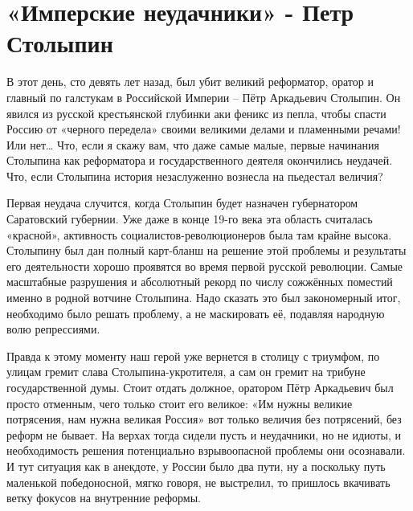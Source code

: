 \chapter{«Имперские неудачники» - Петр Столыпин}

В этот день, сто девять лет назад, был убит великий реформатор, оратор и главный по галстукам в Российской Империи – Пётр Аркадьевич Столыпин. Он явился из русской крестьянской глубинки аки феникс из пепла, чтобы спасти Россию от «черного передела» своими великими делами и пламенными речами! Или нет… Что, если я скажу вам, что даже самые малые, первые начинания Столыпина как реформатора и государственного деятеля окончились неудачей. Что, если Столыпина история незаслуженно вознесла на пьедестал величия?

Первая неудача случится, когда Столыпин будет назначен губернатором Саратовский губернии. Уже даже в конце 19-го века эта область считалась «красной», активность социалистов-революционеров была там крайне высока. Столыпину был дан полный карт-бланш на решение этой проблемы и результаты его деятельности хорошо проявятся во время первой русской революции. Самые масштабные разрушения и абсолютный рекорд по числу сожжённых поместий именно в родной вотчине Столыпина. Надо сказать это был закономерный итог, необходимо было решать проблему, а не маскировать её, подавляя народную волю репрессиями.

Правда к этому моменту наш герой уже вернется в столицу с триумфом, по улицам гремит слава Столыпина-укротителя, а сам он гремит на трибуне государственной думы. Стоит отдать должное, оратором Пётр Аркадьевич был просто отменным, чего только стоит его великое: «Им нужны великие потрясения, нам нужна великая Россия» вот только величия без потрясений, без реформ не бывает. На верхах тогда сидели пусть и неудачники, но не идиоты, и необходимость решения потенциально взрывоопасной проблемы они осознавали. И тут ситуация как в анекдоте, у России было два пути, ну а поскольку путь маленькой победоносной, мягко говоря, не выстрелил, то пришлось вкачивать ветку фокусов на внутренние реформы.

